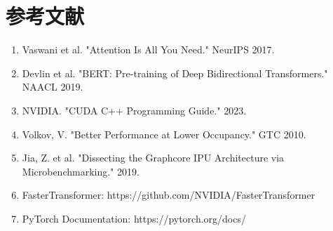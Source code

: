 \documentclass[12pt,a4paper]{article}
\begin{document}
\section*{参考文献}

\begin{enumerate}
    \item Vaswani et al. "Attention Is All You Need." NeurIPS 2017.
    \item Devlin et al. "BERT: Pre-training of Deep Bidirectional Transformers." NAACL 2019.
    \item NVIDIA. "CUDA C++ Programming Guide." 2023.
    \item Volkov, V. "Better Performance at Lower Occupancy." GTC 2010.
    \item Jia, Z. et al. "Dissecting the Graphcore IPU Architecture via Microbenchmarking." 2019.
    \item FasterTransformer: https://github.com/NVIDIA/FasterTransformer
    \item PyTorch Documentation: https://pytorch.org/docs/
\end{enumerate}
\end{document}
